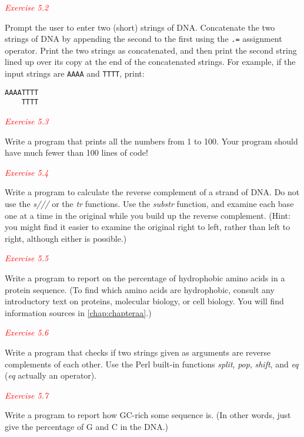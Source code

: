 \textcolor{red}{\textit{Exercise 5.2}}
\begin{adjustwidth}{1cm}{}
Prompt the user to enter two (short) strings of DNA. Concatenate the two strings of DNA by appending the second to the first using the \verb|.=| assignment operator. Print the two strings as concatenated, and then print the second string lined up over its copy at the end of the concatenated strings. For example, if the input strings are \verb|AAAA| and \verb|TTTT|, print:
\begin{verbatim}
AAAATTTT
    TTTT
\end{verbatim}

\end{adjustwidth}

\textcolor{red}{\textit{Exercise 5.3}}
\begin{adjustwidth}{1cm}{}
Write a program that prints all the numbers from 1 to 100. Your program should have much fewer than 100 lines of code! 
\end{adjustwidth}

\textcolor{red}{\textit{Exercise 5.4}}
\begin{adjustwidth}{1cm}{}
Write a program to calculate the reverse complement of a strand of DNA.  Do not use the \textit{s///} or the \textit{tr} functions. Use the \textit{substr} function, and examine each base one at a time in the original while you build up the reverse complement. (Hint: you might find it easier to examine the original right to left, rather than left to right, although either is possible.) 
\end{adjustwidth}

\textcolor{red}{\textit{Exercise 5.5}}
\begin{adjustwidth}{1cm}{}
Write a program to report on the percentage of hydrophobic amino acids in a protein sequence. (To find which amino acids are hydrophobic, consult any introductory text on proteins, molecular biology, or cell biology. You will find information sources in \autoref{chap:chapteraa}.) 
\end{adjustwidth}

\textcolor{red}{\textit{Exercise 5.6}}
\begin{adjustwidth}{1cm}{}
Write a program that checks if two strings given as arguments are
reverse complements of each other. Use the Perl built-in functions
\textit{split}, \textit{pop}, \textit{shift}, and \textit{eq} (\textit{eq} actually an operator). 
\end{adjustwidth}

\textcolor{red}{\textit{Exercise 5.7}}
\begin{adjustwidth}{1cm}{}
Write a program to report how GC-rich some sequence is. (In other words, just give the percentage of G and C in the DNA.)
\end{adjustwidth}


